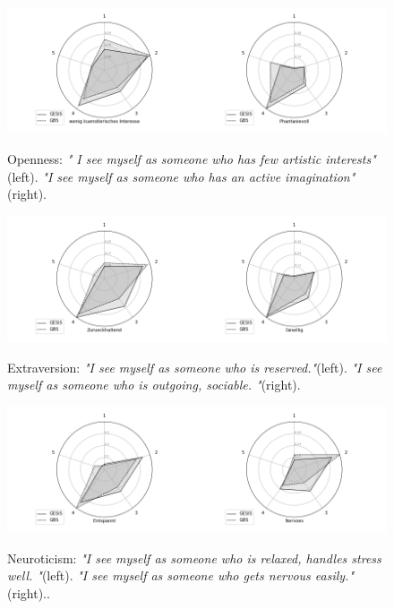                 \begin{figure}[ht]
                \begin{center}
                   \includegraphics[scale=0.55,angle=0]{fig/Opennessfigure}
	         \label{Openness}
	         \caption{ Openness: \textit{" I see myself as someone who has few artistic interests"}(left). \textit{"I see myself as someone who has an active imagination"}(right).}
                \end{center}
                \end{figure}

                \begin{figure}[ht]
                \begin{center}
                   \includegraphics[scale=0.55,angle=0]{fig/Extraversionfigure}
	         \label{Extraversion}
	         \caption{Extraversion: \textit{"I see myself as someone who is reserved."}(left). \textit{"I see myself as someone who is outgoing, sociable. "}(right).}
                \end{center}
                \end{figure}

                \begin{figure}[ht]
                \begin{center}
                   \includegraphics[scale=0.55,angle=0]{fig/Neuroticismfigure}
	         \label{Neuroticism}
	         \caption{Neuroticism: \textit{"I see myself as someone who is relaxed, handles stress well. "}(left). \textit{"I see myself as someone who gets nervous easily."}(right)..}
                \end{center}
                \end{figure}


